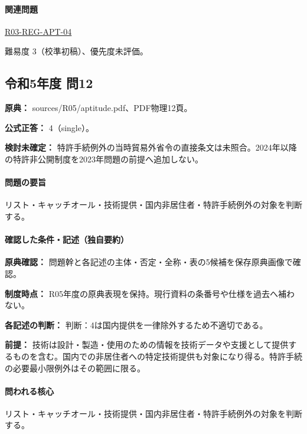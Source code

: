 \paragraph{関連問題} \hyperref[q:r03-reg-apt-04]{R03-REG-APT-04}

\par 難易度 3（校準初稿）、優先度未評価。

\subsection{令和5年度 問12}
\label{q:r05-reg-apt-12}

\noindent\textbf{原典：} sources/R05/aptitude.pdf、PDF物理12頁。

\textbf{公式正答：} 4（single）。

\par\textbf{検討未確定：} 特許手続例外の当時貿易外省令の直接条文は未照合。2024年以降の特許非公開制度を2023年問題の前提へ追加しない。

\paragraph{問題の要旨} リスト・キャッチオール・技術提供・国内非居住者・特許手続例外の対象を判断する。

\paragraph{確認した条件・記述（独自要約）}\mbox{}\par

\noindent\textbf{原典確認：} 問題幹と各記述の主体・否定・全称・表の5候補を保存原典画像で確認。\par

\noindent\textbf{制度時点：} R05年度の原典表現を保持。現行資料の条番号や仕様を過去へ補わない。\par

\noindent\textbf{各記述の判断：} 判断：4は国内提供を一律除外するため不適切である。\par

\noindent\textbf{前提：} 技術は設計・製造・使用のための情報を技術データや支援として提供するものを含む。国内での非居住者への特定技術提供も対象になり得る。特許手続の必要最小限例外はその範囲に限る。\par

\paragraph{問われる核心} リスト・キャッチオール・技術提供・国内非居住者・特許手続例外の対象を判断する。

